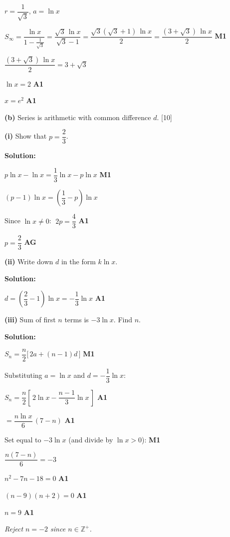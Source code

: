 \documentclass[12pt, twoside]{article}
\begin{document}
\begin{enumerate}[itemsep=0.3cm]
$r = \dfrac{1}{\sqrt{3}}$, \; $a = \ln x$

$S_{\infty} = \dfrac{\ln x}{1 - \frac{1}{\sqrt{3}}}
= \dfrac{\sqrt{3}\, \ln x}{\sqrt{3} - 1}
= \dfrac{\sqrt{3}(\sqrt{3}+1)\, \ln x}{2}
= \dfrac{(3 + \sqrt{3})\, \ln x}{2}$ \hfill \textbf{M1}

$\dfrac{(3 + \sqrt{3})\, \ln x}{2} = 3 + \sqrt{3}$

$\ln x = 2$ \hfill \textbf{A1}

$x = e^2$ \hfill \textbf{A1}

\medskip

\textbf{(b)} Series is arithmetic with common difference $d$. \hfill [10]

\textbf{(i)} Show that $p = \dfrac{2}{3}$.

\textbf{Solution:}

$p \ln x - \ln x = \dfrac{1}{3} \ln x - p \ln x$ \hfill \textbf{M1}

$(p - 1)\ln x = \left(\dfrac{1}{3} - p\right)\ln x$

Since $\ln x \neq 0$: $\; 2p = \dfrac{4}{3}$ \hfill \textbf{A1}

$p = \dfrac{2}{3}$ \hfill \textbf{AG}

\medskip

\textbf{(ii)} Write down $d$ in the form $k \ln x$.

\textbf{Solution:}

$d = \left(\dfrac{2}{3} - 1\right) \ln x = -\dfrac{1}{3} \ln x$ \hfill \textbf{A1}

\medskip

\textbf{(iii)} Sum of first $n$ terms is $-3 \ln x$. Find $n$.

\textbf{Solution:}

$S_n = \dfrac{n}{2}\bigl[\,2a + (n-1)d\,\bigr]$ \hfill \textbf{M1}

Substituting $a = \ln x$ and $d = -\dfrac{1}{3}\ln x$:

$S_n = \dfrac{n}{2}\left[\,2\ln x - \dfrac{n-1}{3}\ln x\,\right]$ \hfill \textbf{A1}

$= \dfrac{n \ln x}{6}\,(7 - n)$ \hfill \textbf{A1}

Set equal to $-3 \ln x$ (and divide by $\ln x > 0$): \hfill \textbf{M1}

$\dfrac{n(7 - n)}{6} = -3$

$n^2 - 7n - 18 = 0$ \hfill \textbf{A1}

$(n - 9)(n + 2) = 0$ \hfill \textbf{A1}

$n = 9$ \hfill \textbf{A1}

\emph{Reject $n = -2$ since $n \in \mathbb{Z}^+$.}

\end{enumerate}
\end{document}
